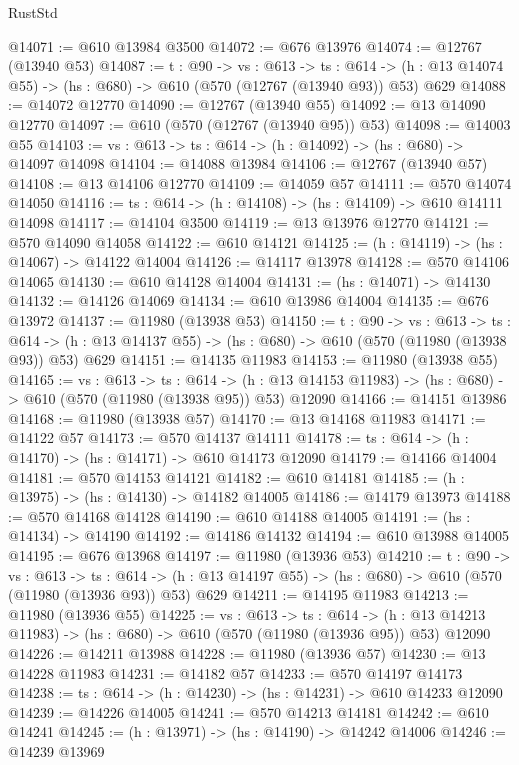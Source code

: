 \begin{lexlean}{RustStd}
\begin{coremodule}
@14071 := @610 @13984 @3500
@14072 := @676 @13976
@14074 := @12767 (@13940 @53)
@14087 := {t : @90} ->
  {vs : @613} ->
  {ts : @614} -> (h : @13 @14074 @55) -> (hs : @680) -> @610 (@570 (@12767 (@13940 @93)) @53) @629
@14088 := @14072 @12770
@14090 := @12767 (@13940 @55)
@14092 := @13 @14090 @12770
@14097 := @610 (@570 (@12767 (@13940 @95)) @53)
@14098 := @14003 @55
@14103 := {vs : @613} -> {ts : @614} -> (h : @14092) -> (hs : @680) -> @14097 @14098
@14104 := @14088 @13984
@14106 := @12767 (@13940 @57)
@14108 := @13 @14106 @12770
@14109 := @14059 @57
@14111 := @570 @14074 @14050
@14116 := {ts : @614} -> (h : @14108) -> (hs : @14109) -> @610 @14111 @14098
@14117 := @14104 @3500
@14119 := @13 @13976 @12770
@14121 := @570 @14090 @14058
@14122 := @610 @14121
@14125 := (h : @14119) -> (hs : @14067) -> @14122 @14004
@14126 := @14117 @13978
@14128 := @570 @14106 @14065
@14130 := @610 @14128 @14004
@14131 := (hs : @14071) -> @14130
@14132 := @14126 @14069
@14134 := @610 @13986 @14004
@14135 := @676 @13972
@14137 := @11980 (@13938 @53)
@14150 := {t : @90} ->
  {vs : @613} ->
  {ts : @614} -> (h : @13 @14137 @55) -> (hs : @680) -> @610 (@570 (@11980 (@13938 @93)) @53) @629
@14151 := @14135 @11983
@14153 := @11980 (@13938 @55)
@14165 := {vs : @613} ->
  {ts : @614} ->
  (h : @13 @14153 @11983) -> (hs : @680) -> @610 (@570 (@11980 (@13938 @95)) @53) @12090
@14166 := @14151 @13986
@14168 := @11980 (@13938 @57)
@14170 := @13 @14168 @11983
@14171 := @14122 @57
@14173 := @570 @14137 @14111
@14178 := {ts : @614} -> (h : @14170) -> (hs : @14171) -> @610 @14173 @12090
@14179 := @14166 @14004
@14181 := @570 @14153 @14121
@14182 := @610 @14181
@14185 := (h : @13975) -> (hs : @14130) -> @14182 @14005
@14186 := @14179 @13973
@14188 := @570 @14168 @14128
@14190 := @610 @14188 @14005
@14191 := (hs : @14134) -> @14190
@14192 := @14186 @14132
@14194 := @610 @13988 @14005
@14195 := @676 @13968
@14197 := @11980 (@13936 @53)
@14210 := {t : @90} ->
  {vs : @613} ->
  {ts : @614} -> (h : @13 @14197 @55) -> (hs : @680) -> @610 (@570 (@11980 (@13936 @93)) @53) @629
@14211 := @14195 @11983
@14213 := @11980 (@13936 @55)
@14225 := {vs : @613} ->
  {ts : @614} ->
  (h : @13 @14213 @11983) -> (hs : @680) -> @610 (@570 (@11980 (@13936 @95)) @53) @12090
@14226 := @14211 @13988
@14228 := @11980 (@13936 @57)
@14230 := @13 @14228 @11983
@14231 := @14182 @57
@14233 := @570 @14197 @14173
@14238 := {ts : @614} -> (h : @14230) -> (hs : @14231) -> @610 @14233 @12090
@14239 := @14226 @14005
@14241 := @570 @14213 @14181
@14242 := @610 @14241
@14245 := (h : @13971) -> (hs : @14190) -> @14242 @14006
@14246 := @14239 @13969

\end{coremodule}
\end{lexlean}
